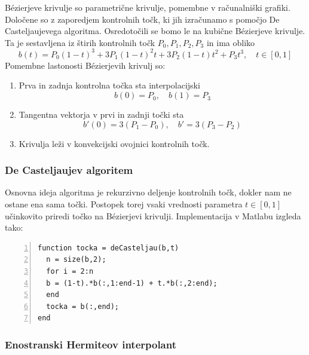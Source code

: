 \documentclass[a4paper,12pt]{article}
\begin{document}
	B\'{e}zierjeve krivulje so parametrične krivulje, pomembne v računalniški grafiki. Določene so z zaporedjem kontrolnih točk, ki jih izračunamo s pomočjo De Casteljaujevega algoritma.
	Osredotočili se bomo le na kubične B\'{e}zierjeve krivulje. Ta je sestavljena iz štirih kontrolnih točk $P_0, P_1, P_2, P_3$ in ima obliko
	\begin{equation*}
		b(t) = P_0(1-t)^3 + 3P_1(1-t)^2t + 3P_2(1-t)t^2 + P_3t^3, \quad t \in [0,1]
	\end{equation*}
	Pomembne lastonosti B\'{e}zierjevih krivulj so: 
	\begin{enumerate}[label=(\roman*)]
		\item Prva in zadnja kontrolna točka sta interpolacijski 
		$$b(0) = P_0,\quad b(1) = P_3$$
		\item Tangentna vektorja v prvi in zadnji točki sta
		$$b'(0) = 3(P_1 - P_0),\quad b' = 3(P_3 - P_2)$$
		\item Krivulja leži v konvekcijski ovojnici kontrolnih točk.

	\end{enumerate}
	
	\subsubsection{De Casteljaujev algoritem}
	
	Osnovna ideja algoritma je rekurzivno deljenje kontrolnih točk, dokler nam ne ostane ena sama točki. Postopek torej vsaki vrednosti parametra $t \in [0,1]$ učinkovito priredi
	točko na B\'{e}zierjevi krivulji.
	Implementacija v Matlabu izgleda tako:
	\begin{lstlisting}[style=Matlab-editor,numbers=left]
function tocka = deCasteljau(b,t)
  n = size(b,2);
  for i = 2:n
  b = (1-t).*b(:,1:end-1) + t.*b(:,2:end);   
  end
  tocka = b(:,end);
end
	\end{lstlisting}
	
	
	\subsubsection{Enostranski Hermiteov interpolant}
	
\end{document}
